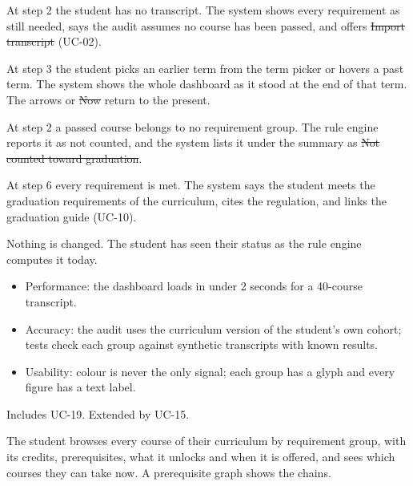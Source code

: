 \begin{altflows}
  \item[A1. No transcript yet.] At step 2 the student has no transcript. The system shows every requirement as still
        needed, says the audit assumes no course has been passed, and offers \st{Import transcript} (UC-02).
  \item[A2. Look at a past term.] At step 3 the student picks an earlier term from the term picker or hovers a past term.
        The system shows the whole dashboard as it stood at the end of that term. The arrows or \st{Now} return to the
        present.
  \item[A3. Course outside the curriculum.] At step 2 a passed course belongs to no requirement group. The rule engine
        reports it as not counted, and the system lists it under the summary as \st{Not counted toward graduation}.
  \item[A4. Graduation status reached.] At step 6 every requirement is met. The system says the student meets the
        graduation requirements of the curriculum, cites the regulation, and links the graduation guide (UC-10).
\end{altflows}

Nothing is changed. The student has seen their status as the rule engine computes it today.

\begin{itemize}
  \item Performance: the dashboard loads in under 2 seconds for a 40-course transcript.
  \item Accuracy: the audit uses the curriculum version of the student's own cohort; tests check each group against
        synthetic transcripts with known results.
  \item Usability: colour is never the only signal; each group has a glyph and every figure has a text label.
\end{itemize}

Includes UC-19. Extended by UC-15.


The student browses every course of their curriculum by requirement group, with its credits, prerequisites, what it
unlocks and when it is offered, and sees which courses they can take now. A prerequisite graph shows the chains.

